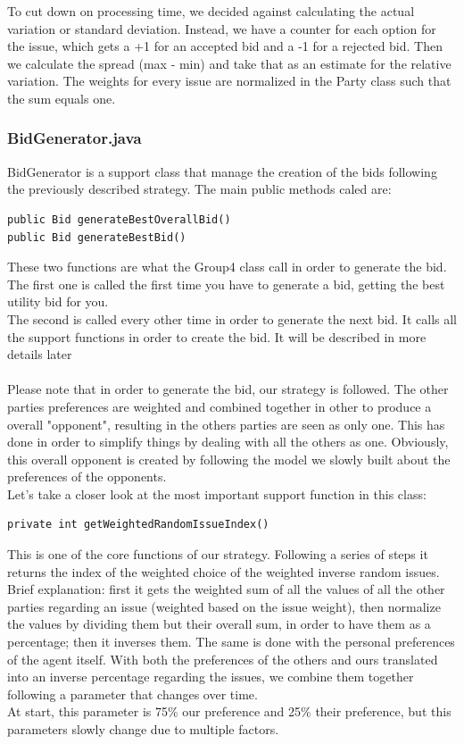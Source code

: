 \documentclass[a4,11pt]{scrartcl}
\begin{document}
To cut down on processing time, we decided against calculating the
actual variation or standard deviation. Instead, we have a counter for
each option for the issue, which gets a +1 for an accepted bid and a
-1 for a rejected bid. Then we calculate the spread (max - min) and
take that as an estimate for the relative variation. The weights for
every issue are normalized in the Party class such that the sum equals
one.


\subsubsection{BidGenerator.java}
BidGenerator is a support class that manage the creation of the bids following the previously described strategy. 
The main public methods caled are:
\begin{lstlisting}
public Bid generateBestOverallBid()
public Bid generateBestBid()
\end{lstlisting}
These two functions are what the Group4 class call in order to generate the bid.\\ The first one is called the first time you have to generate a bid, getting the best utility bid for you. \\The second is called every other time in order to generate the next bid. It calls 
all the support functions in order to create the bid. It will be described in more details later\\ \\
Please note that in order to generate the bid, our strategy is followed. The other parties preferences are weighted and combined together in other to produce a overall "opponent", resulting in the others parties are seen as only one. This has done in order to simplify things by dealing with all the others as one. Obviously, this overall opponent is created by following the model we slowly built about the preferences of the opponents.  \\ 
Let's take a closer look at the most important support function in this class:
\begin{lstlisting}
private int getWeightedRandomIssueIndex()
\end{lstlisting}
This is one of the core functions of our strategy. Following a series of steps it returns the index of the weighted choice of the weighted inverse random issues.\\ Brief explanation: first it gets the weighted sum of all the values of all the other parties regarding an issue (weighted based on the issue weight), then normalize the values by dividing them but their overall sum, in order to have them as a percentage; then it inverses them. The same is done with the personal preferences of the agent itself. With both the preferences of the others and ours translated into an inverse percentage regarding the issues, we combine them together following a parameter that changes over time. \\At start, this parameter is 75\% our preference and 25\%  their preference, but this parameters slowly change due to multiple factors. 
\end{document}
